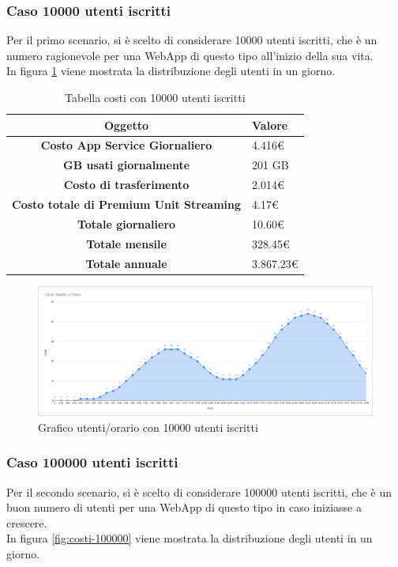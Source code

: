 \subsubsection{Caso 10000 utenti iscritti}
Per il primo scenario, si è scelto di considerare 10000 utenti iscritti, che è un numero ragionevole per una WebApp di questo tipo all'inizio della sua vita.\\
In figura \ref{fig:costi-10000} viene mostrata la distribuzione degli utenti in un giorno.
\begin{table}[H]
    \label{tab:costi-10000}
    \begin{tabularx}{\textwidth}{|c|X|}
        \hline
        \textbf{Oggetto} & \textbf{Valore} \\\hline
        
        \textbf{Costo App Service Giornaliero} & {4.416€} \\ 
        \hline
        \textbf{GB usati giornalmente} & {201 GB} \\ 
        \hline
        \textbf{Costo di trasferimento} & {2.014€}\\
        \hline
        \textbf{Costo totale di Premium Unit Streaming} & {4.17€}\\  
        \hline
        \textbf{Totale giornaliero} & {10.60€}\\  
        \hline
        \textbf{Totale mensile} & {328.45€}\\  
        \hline
        \textbf{Totale annuale} & {3.867.23€}\\  
        \hline
    \end{tabularx}
    \caption{Tabella costi con 10000 utenti iscritti}
\end{table}
\begin{figure}[H]
    \centering
    \includegraphics[scale=0.25]{images/costi/10kuser.png}
    \caption{Grafico utenti/orario con 10000 utenti iscritti}
    \label{fig:costi-10000}
\end{figure}
\subsubsection{Caso 100000 utenti iscritti}
Per il secondo scenario, si è scelto di considerare 100000 utenti iscritti, che è un buon numero di utenti per una WebApp di questo tipo in caso iniziasse a crescere.\\
In figura \ref{fig:costi-100000} viene mostrata la distribuzione degli utenti in un giorno.


